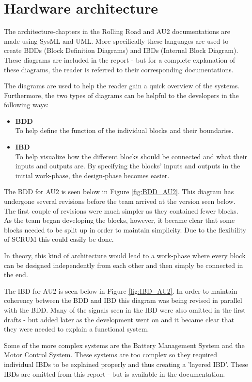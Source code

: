 \chapter{Hardware architecture}
The architecture-chapters in the Rolling Road and AU2 documentations are made using SysML and UML. More specifically these languages are used to create BDDs (Block Definition Diagrams) and IBDs (Internal Block Diagram). These diagrams are included in the report - but for a complete explanation of these diagrams, the reader is referred to their corresponding documentations\cite{RR}\cite{AU2}.

The diagrams are used to help the reader gain a quick overview of the systems. Furthermore, the two types of diagrams can be helpful to the developers in the following ways:
\begin{itemize}
	\item \textbf{BDD}\\
	To help define the function of the individual blocks and their boundaries. 
	\item \textbf{IBD}\\
	To help visualize how the different blocks should be connected and what their inputs and outputs are. By specifying the blocks' inputs and outputs in the initial work-phase, the design-phase becomes easier.
\end{itemize}

The BDD for AU2 is seen below in Figure \vref{fig:BDD_AU2}. This diagram has undergone several revisions before the team arrived at the version seen below. The first couple of revisions were much simpler as they contained fewer blocks. As the team began developing the blocks, however, it became clear that some blocks needed to be split up in order to maintain simplicity. Due to the flexibility of SCRUM this could easily be done.

In theory, this kind of architecture would lead to a work-phase where every block can be designed independently from each other and then simply be connected in the end. 

The IBD for AU2 is seen below in Figure \vref{fig:IBD_AU2}. In order to maintain coherency between the BDD and IBD this diagram was being revised in parallel with the BDD. Many of the signals seen in the IBD were also omitted in the first drafts - but added later as the development went on and it became clear that they were needed to explain a functional system.

Some of the more complex systems are the Battery Management System and the Motor Control System. These systems are too complex so they required individual IBDs to be explained properly and thus creating a 'layered IBD'. These IBDs are omitted from this report - but is available in the documentation\cite{AU2}.


